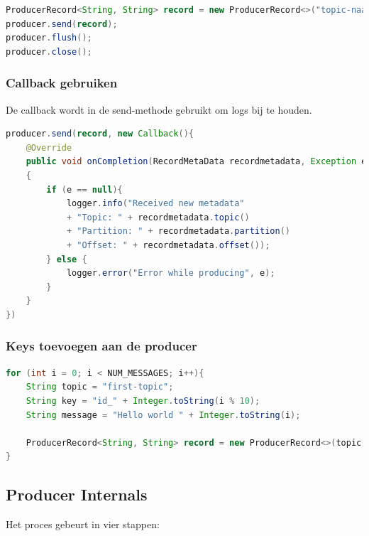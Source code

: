 \documentclass[a4paper,10pt,twoside]{report}
\begin{document}
\begin{lstlisting}[language=Java]
ProducerRecord<String, String> record = new ProducerRecord<>("topic-naam", "message-inhoud-message");
producer.send(record);
producer.flush();
producer.close();
\end{lstlisting}

\subsubsection{Callback gebruiken}

De callback wordt in de send-methode gebruikt om logs bij te houden.

\begin{lstlisting}[language=Java]
producer.send(record, new Callback(){
	@Override
	public void onCompletion(RecordMetaData recordmetadata, Exception e)
	{
		if (e == null){
			logger.info("Received new metadata"
			+ "Topic: " + recordmetadata.topic()
			+ "Partition: " + recordmetadata.partition()
			+ "Offset: " + recordmetadata.offset());	
		} else {
			logger.error("Error while producing", e);
		}
	}
})
\end{lstlisting}

\subsubsection{Keys toevoegen aan de producer}

\begin{lstlisting}[language=Java]
for (int i = 0; i < NUM_MESSAGES; i++){
	String topic = "first-topic";
	String key = "id_" + Integer.toString(i % 10);
	String message = "Hello world " + Integer.toString(i);
	
	ProducerRecord<String, String> record = new ProducerRecord<>(topic, key, message);
}
\end{lstlisting}

\subsection{Producer Internals}

Het proces gebeurt in vier stappen:
\end{document}
